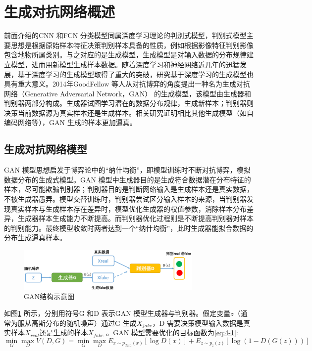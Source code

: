 \section{生成对抗网络概述}
\label{sec:chap02-3}
前面介绍的CNN 和FCN 分类模型同属深度学习理论的判别式模型，判别式模型主要思想是根据原始样本特征决策判别样本具备的性质，例如根据影像特征判别影像包含地物所属类别。与之对应的是生成模型，生成模型是对输入数据的分布规律建立模型，进而用新模型生成样本数据。随着深度学习和神经网络近几年的迅猛发展，基于深度学习的生成模型取得了重大的突破，研究基于深度学习的生成模型也具有重大意义。2014年GoodFellow 等人从对抗博弈的角度提出一种名为生成对抗网络（Generative Adversarial Network，GAN）\cite{goodfellow2014generative} 的生成模型，该模型由生成器和判别器两部分构成。生成器试图学习潜在的数据分布规律，生成新样本；判别器则决策当前数据源为真实样本还是生成样本。相关研究\cite{mirza2014conditional}证明相比其他生成模型（如自编码网络等），GAN 生成的样本更加逼真。

\subsection{生成对抗网络模型}
\label{sec:first-1}
GAN 模型思想启发于博弈论中的“纳什均衡”，即模型训练时不断对抗博弈，模拟数据分布的生成式模型。GAN 模型中生成器目的是生成符合数据潜在分布特征的样本，尽可能欺骗判别器；判别器目的是判断网络输入是生成样本还是真实数据，不被生成器愚弄。模型交替训练时，判别器尝试区分输入样本的来源，当判别器发现真实样本与生成样本存在差异时，模型优化生成器的权值参数，消除样本分布差异，生成器样本生成能力不断提高。而判别器优化过程则是不断提高判别器对样本的判别能力。最终模型收敛时两者达到一个“纳什均衡”，此时生成器能拟合数据的分布生成逼真样本。

\begin{figure}[htb]
  \centering
  \includegraphics[width=0.8\textwidth]{figures/gan}
  \caption{GAN结构示意图}\label{fig:gan}
\end{figure}

如图\ref{fig:gan} 所示，分别用符号G 和D 表示GAN 模型生成器与判别器。假定变量$z$（通常为服从高斯分布的随机噪声）通过G 生成$X_{fake}$，D 需要决策模型输入数据是真实样本$X_{real}$还是生成的样本$X_{fake}$ 。GAN 模型需要优化的目标函数为\ref{eq:4-1}:
\begin{equation}
  \label{eq:4-1}
  \mathop{\min}_{G} \mathop{\max}_{D} V(D,G) = \mathop{\min}_{G} \mathop{\max}_{D} E_{x \sim p_{data}(x)} [\log D(x)] + E_{z \sim p_{z}(z)}[ \log (1-D(G(z)))]
\end{equation}

